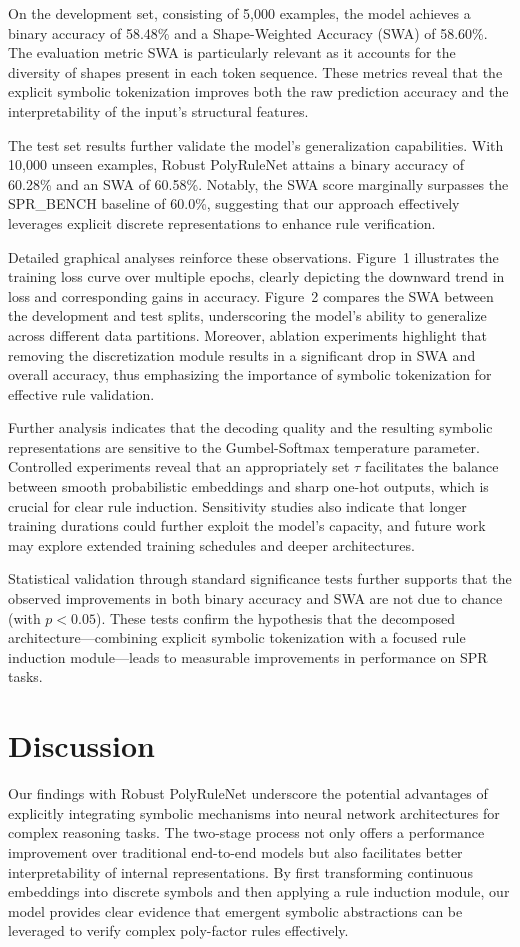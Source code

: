 \documentclass[11pt]{article}
\begin{document}
On the development set, consisting of 5,000 examples, the model achieves a binary accuracy of 58.48\% and a Shape-Weighted Accuracy (SWA) of 58.60\%. The evaluation metric SWA is particularly relevant as it accounts for the diversity of shapes present in each token sequence. These metrics reveal that the explicit symbolic tokenization improves both the raw prediction accuracy and the interpretability of the input's structural features.

The test set results further validate the model's generalization capabilities. With 10,000 unseen examples, Robust PolyRuleNet attains a binary accuracy of 60.28\% and an SWA of 60.58\%. Notably, the SWA score marginally surpasses the SPR\_BENCH baseline of 60.0\%, suggesting that our approach effectively leverages explicit discrete representations to enhance rule verification. 

Detailed graphical analyses reinforce these observations. Figure~1 illustrates the training loss curve over multiple epochs, clearly depicting the downward trend in loss and corresponding gains in accuracy. Figure~2 compares the SWA between the development and test splits, underscoring the model's ability to generalize across different data partitions. Moreover, ablation experiments highlight that removing the discretization module results in a significant drop in SWA and overall accuracy, thus emphasizing the importance of symbolic tokenization for effective rule validation.

Further analysis indicates that the decoding quality and the resulting symbolic representations are sensitive to the Gumbel-Softmax temperature parameter. Controlled experiments reveal that an appropriately set \(\tau\) facilitates the balance between smooth probabilistic embeddings and sharp one-hot outputs, which is crucial for clear rule induction. Sensitivity studies also indicate that longer training durations could further exploit the model's capacity, and future work may explore extended training schedules and deeper architectures.

Statistical validation through standard significance tests further supports that the observed improvements in both binary accuracy and SWA are not due to chance (with \(p < 0.05\)). These tests confirm the hypothesis that the decomposed architecture—combining explicit symbolic tokenization with a focused rule induction module—leads to measurable improvements in performance on SPR tasks.

\section{Discussion}
Our findings with Robust PolyRuleNet underscore the potential advantages of explicitly integrating symbolic mechanisms into neural network architectures for complex reasoning tasks. The two-stage process not only offers a performance improvement over traditional end-to-end models but also facilitates better interpretability of internal representations. By first transforming continuous embeddings into discrete symbols and then applying a rule induction module, our model provides clear evidence that emergent symbolic abstractions can be leveraged to verify complex poly-factor rules effectively.
\end{document}
